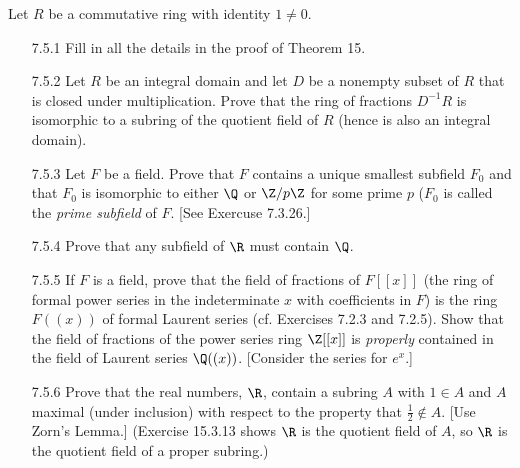 Let $R$ be a commutative ring with identity $1 \neq 0$.
\begin{enumerate}
   \item[7.5.1]   Fill in all the details in the proof of Theorem 15.
   \item[7.5.2]   Let $R$ be an integral domain and let $D$ be a nonempty subset
                  of $R$ that is closed under multiplication. Prove that the
                  ring of fractions $D^{-1}R$ is isomorphic to a subring of the
                  quotient field of $R$ (hence is also an integral domain).
   \item[7.5.3]   Let $F$ be a field. Prove that $F$ contains a unique smallest
                  subfield $F_0$ and that $F_0$ is isomorphic to either $\Q$ or
                  $\Z/p\Z$ for some prime $p$ ($F_0$ is called the
                  \textit{prime subfield} of $F$. [See Exercuse 7.3.26.]
   \item[7.5.4]  Prove that any subfield of $\R$ must contain $\Q$.
   \item[7.5.5]   If $F$ is a field, prove that the field of fractions of
                  $F[[x]]$ (the ring of formal power series in the indeterminate
                  $x$ with coefficients in $F$) is the ring $F((x))$ of formal
                  Laurent series (cf. Exercises 7.2.3 and 7.2.5). Show that the
                  field of fractions of the power series ring $\Z[[x]]$ is
                  \textit{properly} contained in the field of Laurent series
                  $\Q((x))$. [Consider the series for $e^x$.]
   \item[7.5.6]   Prove that the real numbers, $\R$, contain a subring $A$ with
                  $1 \in A$ and $A$ maximal (under inclusion) with respect to
                  the property that $\frac{1}{2} \notin A$. [Use Zorn's Lemma.]
                  (Exercise 15.3.13 shows $\R$ is the quotient field of $A$, so
                  $\R$ is the quotient field of a proper subring.)
\end{enumerate}
